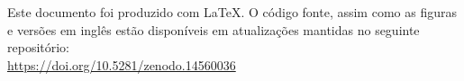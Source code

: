 \documentclass[./main.tex]{subfiles}
\begin{document}
\doublespacing %
\large

\newpage
\renewcommand{\headrulewidth}{0pt}
\thispagestyle{fancy}
\fancyhf{} %
\fancyfoot{} %
\fancyfoot[C]{\thepage}

\begin{center}
    \vspace{5mm}
\end{center}
\singlespacing
\normalsize

\setlength{\parskip}{\myparskip}

\noindent Este documento foi produzido com \LaTeX. O código fonte, assim como as figuras e versões em inglês estão disponíveis em atualizações mantidas no seguinte repositório: \\
\noindent \href{https://doi.org/10.5281/zenodo.14560036}{https://doi.org/10.5281/zenodo.14560036}


\clearpage
\end{document}
